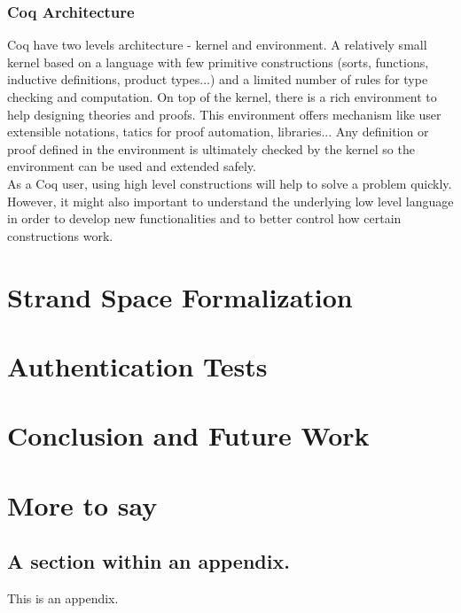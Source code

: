\subsection{Coq Architecture}
Coq have two levels architecture - kernel and environment. A relatively small kernel based on a language with few primitive constructions (sorts, functions, inductive definitions, product types...) and a limited number of rules for type checking and computation. On top of the kernel, there is a rich environment to help designing theories and proofs. This environment offers mechanism like user extensible notations, tatics for proof automation, libraries... Any definition or proof defined in the environment is ultimately checked by the kernel so the environment can be used and extended safely.\\
As a Coq user, using high level constructions will help to solve a problem quickly. However, it might also important to understand the underlying low level language in order to develop new functionalities and to better control how certain constructions work. 
 
\chapter{Strand Space Formalization}


\chapter{Authentication Tests}

\chapter{Conclusion and Future Work}


\appendix

\chapter{More to say}

\section{A section within an appendix.}
This is an appendix.



